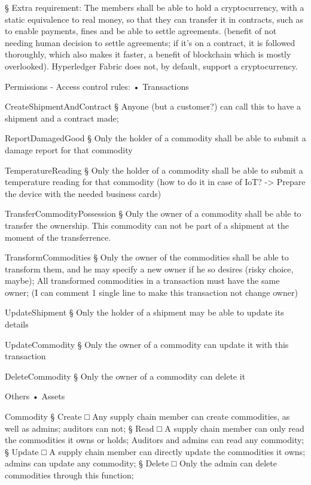 {			§ Extra requirement: The members shall be able to hold a cryptocurrency, with a static equivalence to real money, so that they can transfer it in contracts, such as to enable payments, fines and be able to settle agreements. (benefit of not needing human decision to settle agreements; if it's on a contract, it is followed thoroughly, which also makes it faster, a benefit of blockchain which is mostly overlooked). Hyperledger Fabric does not, by default, support a cryptocurrency.

Permissions - Access control rules:
	• Transactions
		\par CreateShipmentAndContract
			§ Anyone (but a customer?) can call this to have a shipment and a contract made;
		\par ReportDamagedGood
			§ Only the holder of a commodity shall be able to submit a damage report for that commodity
		\par TemperatureReading
			§ Only the holder of a commodity shall be able to submit a temperature reading for that commodity (how to do it in case of IoT? -> Prepare the device with the needed business cards)
		\par TransferCommodityPossession
			§ Only the owner of a commodity shall be able to transfer the ownership. This commodity can not be part of a shipment at the moment of the transferrence. 
		\par TransformCommodities
			§ Only the owner of the commodities shall be able to transform them, and he may specify a new owner if he so desires (risky choice, maybe); All transformed commodities in a transaction must have the same owner; (I can comment 1 single line to make this transaction not change owner)
		\par UpdateShipment
			§ Only the holder of a shipment may be able to update its details
		\par UpdateCommodity
			§ Only the owner of a commodity can update it with this transaction
		\par DeleteCommodity
			§ Only the owner of a commodity can delete it
		\par Others
	• Assets
		\par Commodity
			§ Create
				□ Any supply chain member can create commodities, as well as admins; auditors can not;
			§ Read
				□ A supply chain member can only read the commodities it owns or holds; Auditors and admins can read any commodity;
			§ Update
				□ A supply chain member can directly update the commodities it owns; admins can update any commodity;
			§ Delete
				□ Only the admin can delete commodities through this function;
}
